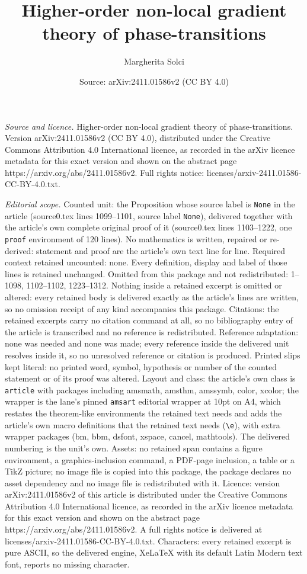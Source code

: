 \documentclass[10pt,a4paper]{amsart}
\title[Higher-order non-local gradient theory of phase-transitions]{Higher-order non-local gradient theory of phase-transitions}
\author{Margherita Solci}
\date{Source: arXiv:2411.01586v2 (CC BY 4.0)}
\begin{document}
\maketitle

\noindent\emph{Source and licence.} Higher-order non-local gradient theory of phase-transitions. Version arXiv:2411.01586v2 (CC BY 4.0), distributed under the Creative Commons Attribution 4.0 International licence, as recorded in the arXiv licence metadata for this exact version and shown on the abstract page https://arxiv.org/abs/2411.01586v2. Full rights notice: licenses/arxiv-2411.01586-CC-BY-4.0.txt.\par\smallskip

\noindent\textit{Editorial scope.} Counted unit: the Proposition whose source label is \texttt{None} in the article (source0.tex lines 1099--1101, source label \texttt{None}), delivered together with the article's own complete original proof of it (source0.tex lines 1103--1222, one \texttt{proof} environment of 120 lines). No mathematics is written, repaired or re-derived: statement and proof are the article's own text line for line. Required context retained uncounted: none. Every definition, display and label of those lines is retained unchanged. Omitted from this package and not redistributed: 1--1098, 1102--1102, 1223--1312. Nothing inside a retained excerpt is omitted or altered: every retained body is delivered exactly as the article's lines are written, so no omission receipt of any kind accompanies this package. Citations: the retained excerpts carry no citation command at all, so no bibliography entry of the article is transcribed and no reference is redistributed. Reference adaptation: none was needed and none was made; every reference inside the delivered unit resolves inside it, so no unresolved reference or citation is produced. Printed slips kept literal: no printed word, symbol, hypothesis or number of the counted statement or of its proof was altered. Layout and class: the article's own class is \texttt{article} with packages including amsmath, amsthm, amssymb, color, xcolor; the wrapper is the lane's pinned \texttt{amsart} editorial wrapper at 10pt on A4, which restates the theorem-like environments the retained text needs and adds the article's own macro definitions that the retained text needs (\texttt{\textbackslash e}), with extra wrapper packages (bm, bbm, dsfont, xspace, cancel, mathtools). The delivered numbering is the unit's own. Assets: no retained span contains a figure environment, a graphics-inclusion command, a PDF-page inclusion, a table or a TikZ picture; no image file is copied into this package, the package declares no asset dependency and no image file is redistributed with it. Licence: version arXiv:2411.01586v2 of this article is distributed under the Creative Commons Attribution 4.0 International licence, as recorded in the arXiv licence metadata for this exact version and shown on the abstract page https://arxiv.org/abs/2411.01586v2. A full rights notice is delivered at licenses/arxiv-2411.01586-CC-BY-4.0.txt. Characters: every retained excerpt is pure ASCII, so the delivered engine, XeLaTeX with its default Latin Modern text font, reports no missing character.
\end{document}
